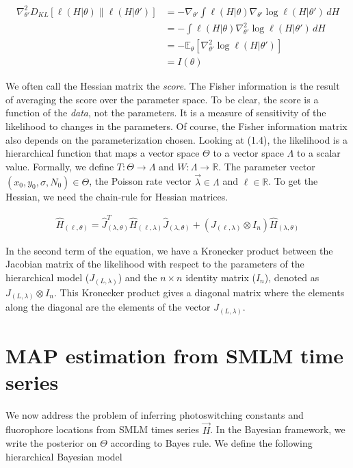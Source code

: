 \documentclass{ucetd}
\begin{document}
\begin{align*}
\nabla^2_{\theta'} D_{KL}[\ell(H|\theta) \parallel \ell(H|\theta')] 
&= - \nabla_{\theta'} \int \ell(H|\theta) \nabla_{\theta'}  \log \ell(H|\theta') \, dH \\ 
&= - \int \ell(H|\theta) \nabla^2_{\theta'}  \log \ell(H|\theta') \, dH \\
&= - \mathbb{E}_{\theta}[\nabla^2_{\theta'} \log \ell(H|\theta')] \\
&= I(\theta)
\end{align*}


We often call the Hessian matrix the \emph{score}. The Fisher information is the result of averaging the score over the parameter space. To be clear, the score is a function of the \emph{data}, not the parameters. It is a measure of sensitivity of the likelihood to changes in the parameters. Of course, the Fisher information matrix also depends on the parameterization chosen. Looking at (1.4), the likelihood is a hierarchical function that maps a vector space $\Theta$ to a vector space $\Lambda$ to a scalar value. Formally, we define $T: \Theta \rightarrow \Lambda$ and $W: \Lambda \rightarrow \mathbb{R}$. The parameter vector $(x_{0},y_{0},\sigma, N_{0})\in \Theta$, the Poisson rate vector $\vec{\lambda} \in \Lambda$ and $\ell \in \mathbb{R}$. To get the Hessian, we need the chain-rule for Hessian matrices.


\begin{align*}
\hat{H}_{(\ell,\theta)} = \hat{J}_{(\lambda,\theta)}^{T} \hat{H}_{(\ell,\lambda)} \hat{J}_{(\lambda,\theta)} + (J_{(\ell,\lambda)}\otimes I_{n})\hat{H}_{(\lambda,\theta)}
\end{align*}

In the second term of the equation, we have a Kronecker product between the Jacobian matrix of the likelihood with respect to the parameters of the hierarchical model ($J_{(L,\lambda)}$) and the $n\times n$ identity matrix ($I_n$), denoted as $J_{(L,\lambda)}\otimes I_n$. This Kronecker product gives a diagonal matrix where the elements along the diagonal are the elements of the vector $J_{(L,\lambda)}$.


\section{MAP estimation from SMLM time series}


We now address the problem of inferring photoswitching constants and fluorophore locations from SMLM times series $\vec{H}$. In the Bayesian framework, we write the posterior on $\Theta$ according to Bayes rule. We define the following hierarchical Bayesian model
\end{document}
